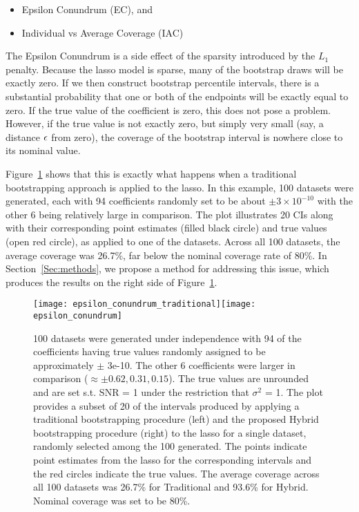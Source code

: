 \begin{itemize}
\item Epsilon Conundrum (EC), and
\item Individual vs Average Coverage (IAC)
\end{itemize}

The Epsilon Conundrum is a side effect of the sparsity introduced by the $L_1$ penalty. Because the lasso model is sparse, many of the bootstrap draws will be exactly zero. If we then construct bootstrap percentile intervals, there is a substantial probability that one or both of the endpoints will be exactly equal to zero. If the true value of the coefficient is zero, this does not pose a problem. However, if the true value is not exactly zero, but simply very small (say, a distance $\epsilon$ from zero), the coverage of the bootstrap interval is nowhere close to its nominal value.

Figure~\ref{Fig:ec} shows that this is exactly what happens when a traditional bootstrapping approach is applied to the lasso. In this example, 100 datasets were generated, each with 94 coefficients randomly set to be about $\pm 3 \times 10^{-10}$ with the other 6 being relatively large in comparison. The plot illustrates 20 CIs along with their corresponding point estimates (filled black circle) and true values (open red circle), as applied to one of the datasets. Across all 100 datasets, the average coverage was 26.7\%, far below the nominal coverage rate of 80\%. In Section~\ref{Sec:methods}, we propose a method for addressing this issue, which produces the results on the right side of Figure~\ref{Fig:ec}.

\begin{figure}[hbtp]
  \begin{center}
    \texttt{[image: epsilon\_conundrum\_traditional]}\texttt{[image: epsilon\_conundrum]}
    \caption{\label{Fig:ec} 100 datasets were generated under independence with 94 of the coefficients having true values randomly assigned to be approximately $\pm$ 3e-10. The other 6 coefficients were larger in comparison ($\approx \pm 0.62, 0.31, 0.15$). The true values are unrounded and are set s.t. SNR = 1 under the restriction that $\sigma^2$ = 1. The plot provides a subset of 20 of the intervals produced by applying a traditional bootstrapping procedure (left) and the proposed Hybrid bootstrapping procedure (right) to the lasso for a single dataset, randomly selected among the 100 generated. The points indicate point estimates from the lasso for the corresponding intervals and the red circles indicate the true values. The average coverage across all 100 datasets was 26.7\% for Traditional and 93.6\% for Hybrid. Nominal coverage was set to be 80\%.}
  \end{center}
\end{figure}

